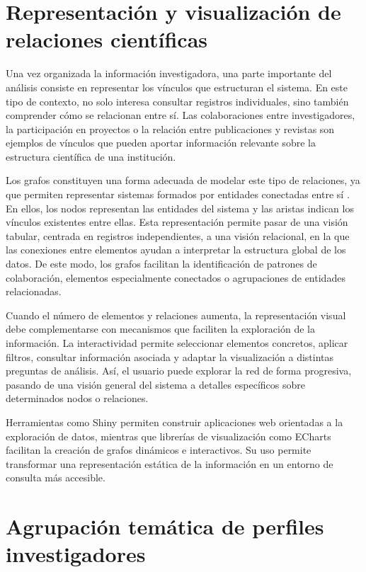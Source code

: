\documentclass[11pt,spanish,listoffigures,listoftables]{tfgetsinf}
\begin{document}
\section{Representación y visualización de relaciones científicas}

Una vez organizada la información investigadora, una parte importante del análisis consiste en representar los vínculos que estructuran el sistema. En este tipo de contexto, no solo interesa consultar registros individuales, sino también comprender cómo se relacionan entre sí. Las colaboraciones entre investigadores, la participación en proyectos o la relación entre publicaciones y revistas son ejemplos de vínculos que pueden aportar información relevante sobre la estructura científica de una institución.

Los grafos constituyen una forma adecuada de modelar este tipo de relaciones, ya que permiten representar sistemas formados por entidades conectadas entre sí \cite{newmannetworks}. En ellos, los nodos representan las entidades del sistema y las aristas indican los vínculos existentes entre ellas. Esta representación permite pasar de una visión tabular, centrada en registros independientes, a una visión relacional, en la que las conexiones entre elementos ayudan a interpretar la estructura global de los datos. De este modo, los grafos facilitan la identificación de patrones de colaboración, elementos especialmente conectados o agrupaciones de entidades relacionadas.

Cuando el número de elementos y relaciones aumenta, la representación visual debe complementarse con mecanismos que faciliten la exploración de la información. La interactividad permite seleccionar elementos concretos, aplicar filtros, consultar información asociada y adaptar la visualización a distintas preguntas de análisis. Así, el usuario puede explorar la red de forma progresiva, pasando de una visión general del sistema a detalles específicos sobre determinados nodos o relaciones.

Herramientas como Shiny permiten construir aplicaciones web orientadas a la exploración de datos, mientras que librerías de visualización como ECharts facilitan la creación de grafos dinámicos e interactivos. Su uso permite transformar una representación estática de la información en un entorno de consulta más accesible.

\section{Agrupación temática de perfiles investigadores}
\end{document}
